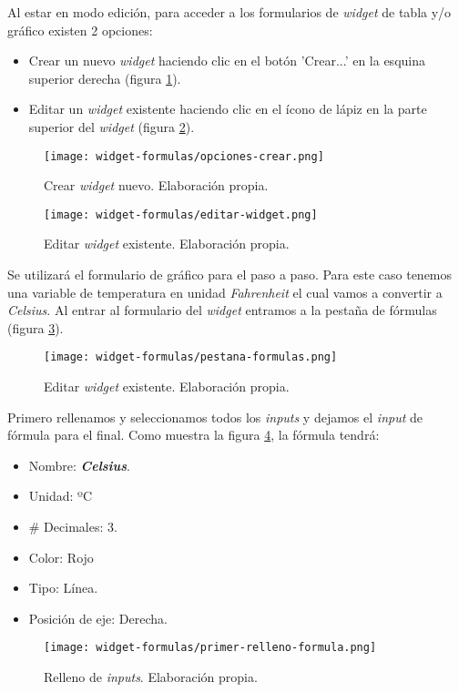 Al estar en modo edición, para acceder a los formularios de \textit{widget} de tabla y/o gráfico existen 2 opciones:
\begin{itemize}
	\item Crear un nuevo \textit{widget} haciendo clic en el botón 'Crear...' en la esquina superior derecha (figura \ref{fig:opciones-crear}).
	\item Editar un \textit{widget} existente haciendo clic en el ícono de lápiz en la parte superior del \textit{widget} (figura \ref{fig:editar-widget}).
\end{itemize}
\iffalse pasos para ingresar al formulario de ambas formas \fi
\begin{figure}[H]
	\centering
	\texttt{[image: widget-formulas/opciones-crear.png]}
	\caption{\label{fig:opciones-crear} Crear \textit{widget} nuevo. Elaboración propia.}
\end{figure}
\begin{figure}[H]
	\centering
	\texttt{[image: widget-formulas/editar-widget.png]}
	\caption{\label{fig:editar-widget} Editar \textit{widget} existente. Elaboración propia.}
\end{figure}

Se utilizará el formulario de gráfico para el paso a paso. Para este caso tenemos una variable de temperatura en unidad \textit{Fahrenheit} el cual vamos a convertir a \textit{Celsius}.
Al entrar al formulario del \textit{widget} entramos a la pestaña de fórmulas (figura \ref{fig:pestana-formulas}).
\iffalse ingresar a formulas \fi
\begin{figure}[H]
	\centering
	\texttt{[image: widget-formulas/pestana-formulas.png]}
	\caption{\label{fig:pestana-formulas} Editar \textit{widget} existente. Elaboración propia.}
\end{figure}
Primero rellenamos y seleccionamos todos los \textit{inputs} y dejamos el \textit{input} de fórmula para el final. Como muestra la figura \ref{fig:primer-relleno-formula}, la fórmula tendrá:
\begin{itemize}
	\item Nombre: \textbf{\textit{Celsius}}.
	\item Unidad: ºC
	\item \# Decimales: 3.
	\item Color: Rojo
	\item Tipo: Línea.
	\item Posición de eje: Derecha.
\end{itemize}
\iffalse relleno de inputs \fi
\begin{figure}[H]
	\centering
	\texttt{[image: widget-formulas/primer-relleno-formula.png]}
	\caption{\label{fig:primer-relleno-formula} Relleno de \textit{inputs}. Elaboración propia.}
\end{figure}

